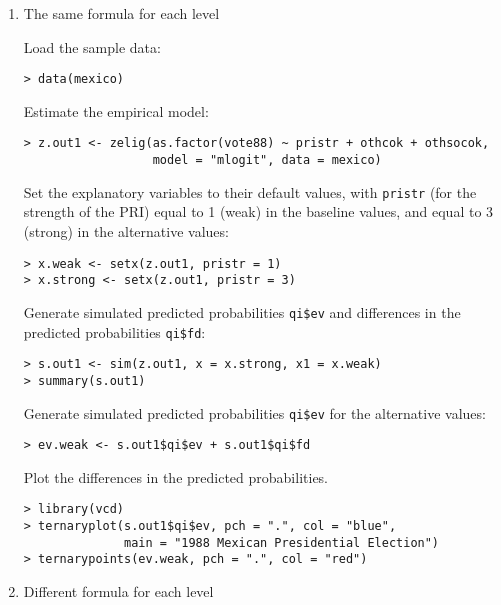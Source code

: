 \begin{enumerate}

\item {The same formula for each level}

Load the sample data:  
\begin{verbatim}
> data(mexico)
\end{verbatim}
Estimate the empirical model:  
\begin{verbatim}
> z.out1 <- zelig(as.factor(vote88) ~ pristr + othcok + othsocok, 
                  model = "mlogit", data = mexico)
\end{verbatim}
Set the explanatory variables to their default values, with {\tt pristr}
(for the strength of the PRI) equal to 1 (weak) in the baseline values, and
equal to 3 (strong) in the alternative values:  
\begin{verbatim}
> x.weak <- setx(z.out1, pristr = 1)
> x.strong <- setx(z.out1, pristr = 3)
\end{verbatim}
Generate simulated predicted probabilities {\tt qi\$ev} and differences in
the predicted probabilities {\tt qi\$fd}:
\begin{verbatim}
> s.out1 <- sim(z.out1, x = x.strong, x1 = x.weak)
> summary(s.out1)
\end{verbatim}
Generate simulated predicted probabilities {\tt qi\$ev} for the
alternative values:  
\begin{verbatim}
> ev.weak <- s.out1$qi$ev + s.out1$qi$fd
\end{verbatim}
Plot the differences in the predicted probabilities.  
\begin{verbatim}
> library(vcd)
> ternaryplot(s.out1$qi$ev, pch = ".", col = "blue", 
              main = "1988 Mexican Presidential Election")
> ternarypoints(ev.weak, pch = ".", col = "red")
\end{verbatim}

\item {Different formula for each level}


\end{enumerate}
